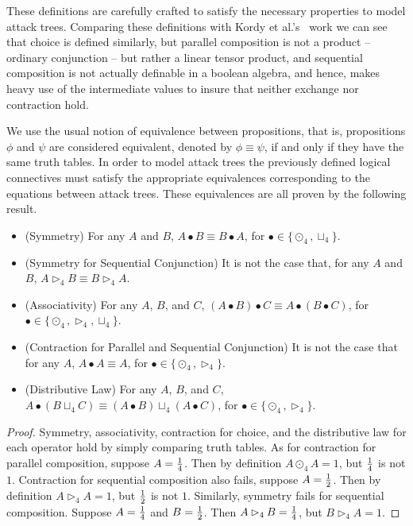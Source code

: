 These definitions are carefully crafted to satisfy the necessary
properties to model attack trees.  Comparing these definitions with
Kordy et al.'s~\cite{Kordy:2012} work we can see that choice is
defined similarly, but parallel composition is not a product --
ordinary conjunction -- but rather a linear tensor product, and
sequential composition is not actually definable in a boolean algebra,
and hence, makes heavy use of the intermediate values to insure that
neither exchange nor contraction hold.  

We use the usual notion of equivalence between propositions, that is,
propositions $\phi$ and $\psi$ are considered equivalent, denoted by
$\phi \equiv \psi$, if and only if they have the same truth tables. In
order to model attack trees the previously defined logical connectives
must satisfy the appropriate equivalences corresponding to the
equations between attack trees.  These equivalences are all proven by
the following result.
\begin{lemma}
  \label{lemma:props_atree_ops_quaternary-semantics}
  \begin{itemize}
  \item[] (Symmetry) For any $A$ and $B$, $A \bullet B \equiv B \bullet A$, for $\bullet \in \{\odot_4, \sqcup_4\}$.\\[-5px]
  \item[] (Symmetry for Sequential Conjunction) It is not the case that, for any $A$ and $B$, $A \rhd_4 B \equiv B \rhd_4 A$.\\[-5px]
  \item[] (Associativity) For any $A$, $B$, and $C$, $(A \bullet B) \bullet C \equiv A \bullet (B \bullet C)$, for $\bullet \in \{\odot_4, \rhd_4, \sqcup_4\}$.\\[-5px]
  \item[] (Contraction for Parallel and Sequential Conjunction) It is not the case that for any $A$, $A \bullet A \equiv A$, for $\bullet \in \{\odot_4, \rhd_4\}$.\\[-5px]
  \item[] (Distributive Law) For any $A$, $B$, and $C$, $A \bullet (B \sqcup_4 C) \equiv (A \bullet B) \sqcup_4 (A \bullet C)$, for $\bullet \in \{\odot_4, \rhd_4\}$.\\[-5px]
  \end{itemize}
\end{lemma}
\begin{proof}
  Symmetry, associativity, contraction for choice, and the
  distributive law for each operator hold by simply comparing truth
  tables.  As for contraction for parallel composition, suppose $A =
  \frac{1}{4}$.  Then by definition $A \odot_4 A = 1$, but $\frac{1}{4}$ is not
  $1$.  Contraction for sequential composition also fails, suppose $A
  = \frac{1}{2}$.  Then by definition $A \rhd_4 A = 1$, but $\frac{1}{2}$ is not
  $1$.  Similarly, symmetry fails for sequential composition. Suppose
  $A = \frac{1}{4}$ and $B = \frac{1}{2}$.  Then $A \rhd_4 B = \frac{1}{4}$, but $B
  \rhd_4 A = 1$.
\end{proof}


